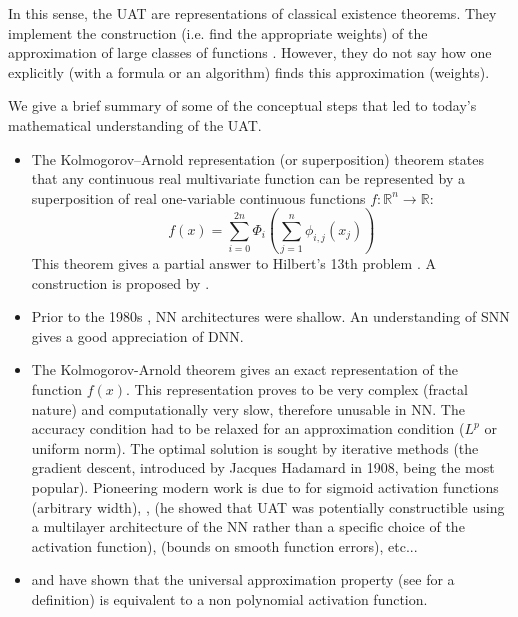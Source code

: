 In this sense, the UAT are representations of classical existence theorems. They implement the construction (i.e. find the appropriate weights) of the approximation of large classes of functions \citep{paluzo2020two}. However, they do not say how one explicitly (with a formula or an algorithm) finds this approximation (weights).

We give a brief summary of some of the conceptual steps that led to today's mathematical understanding of the UAT.

\begin{itemize}
\item The Kolmogorov--Arnold representation (or superposition) theorem \citep{kolmogorov1957representation} states that any continuous real multivariate function can be represented by a superposition of real one-variable continuous functions $f:\mathbb{R}^{n}\rightarrow\mathbb{R}$:
\[
f(x)  =\sum_{i=0}^{2n}\Phi_{i}\left(  \sum_{j=1}^{n}\phi
_{i,j}(x_{j})  \right)
\]
This theorem gives a partial answer to Hilbert's 13th problem \citep{akashi2001application,khesin2014arnold}. A construction is proposed by \cite{polar2020urysohn}.

\item Prior to the 1980s \citep{mcculloch1943logical,fukushima1975cognitron}, NN architectures were shallow. An understanding of SNN gives a good appreciation of DNN.

\item The Kolmogorov-Arnold theorem gives an exact representation of the function $f(x)$. This representation proves to be very complex (fractal nature) and computationally very slow, therefore unusable in NN. The accuracy condition had to be relaxed for an approximation condition ($L^{p}$
or uniform norm). The optimal solution is sought by iterative methods (the
gradient descent, introduced by Jacques Hadamard in 1908, being the most
popular). Pioneering modern work is due to \cite{cybenko1989approximation} for
sigmoid activation functions (arbitrary width), \cite{funahashi1989approximate}, \cite{hornik1991approximation} (he showed that UAT was
potentially constructible using a multilayer architecture of the NN rather
than a specific choice of the activation function), \cite{barron1993universal} (bounds on smooth function errors), etc...

\item  \cite{leshno1993multilayer} and \cite{pinkus1999approximation} have
shown that the universal approximation property (see \cite{kratsios2019universal} for a
definition) is equivalent to a non polynomial activation function.
\end{itemize}

